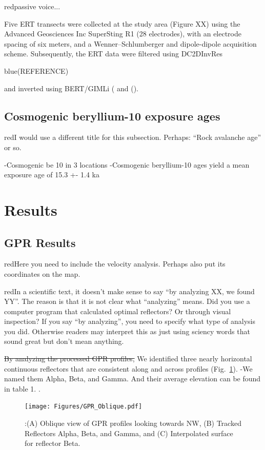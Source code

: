 \documentclass[5p]{elsarticle}
\newcommand{\COMON}{\begin{color}{blue}}
\newcommand{\COMOFF}{\end{color}}
\newcommand{\alon}{\begin{color}{red}}
\newcommand{\aloff}{\end{color}}
\begin{document}
\alon passive voice... \aloff
Five ERT transects were collected at the study area (Figure XX) using the Advanced Geosciences Inc SuperSting R1 (28 electrodes), with an electrode spacing of six meters, and a Wenner–Schlumberger and dipole-dipole acquisition scheme. Subsequently, the ERT data were filtered using DC2DInvRes \COMON (REFERENCE) \COMOFF and inverted using BERT/GIMLi (\cite{gunther2006three} and (\cite{Ruecker2017}).


\subsection{Cosmogenic beryllium-10 exposure ages}
\alon I would use a different title for this subsection. Perhaps:
``Rock avalanche age'' or so. \aloff

-Cosmogenic be 10 in 3 locations
-Cosmogenic beryllium-10 ages yield a mean exposure age of 15.3 +- 1.4 ka


 
\section{Results}




\subsection{GPR Results}

\alon Here you need to include the velocity analysis. Perhaps also put
its coordinates on the map.\aloff

\alon In a scientific text, it doesn't make sense to say ``by analyzing
XX, we found YY''. The reason is that it is not clear what
``analyzing'' means. Did you use a computer program that calculated
optimal reflectors? Or through visual inspection? If you say ``by
analyzing'', you need to specify what type of analysis you
did. Otherwise readers may interpret this as just using sciency words
that sound great but don't mean anything.\aloff

\sout{By analyzing the processed GPR profiles,} We identified three nearly horizontal continuous reflectors that are consistent along and across profiles (Fig.~\ref{GPR_Oblique}). -We named them Alpha, Beta, and Gamma.  And their average elevation can be found in table 1. 
. 

								 \begin{figure}[h]

	\texttt{[image: Figures/GPR\_Oblique.pdf]}
		\caption{:(A) Oblique view of GPR profiles looking towards NW, (B) Tracked Reflectors Alpha, Beta, and Gamma, and (C) Interpolated surface for reflector Beta. \label{GPR_Oblique}}

								   \end{figure}
								   
\end{document}
